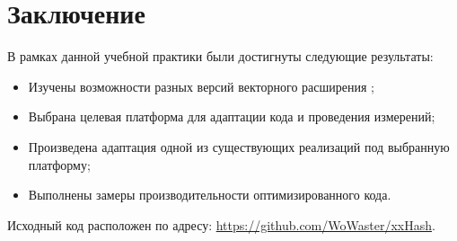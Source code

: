 
\section*{Заключение}
В рамках данной учебной практики были достигнуты следующие результаты:
\begin{itemize}
	\item Изучены возможности разных версий векторного расширения \riscv{};
	\item Выбрана целевая платформа для адаптации кода и проведения измерений;
	\item Произведена адаптация одной из существующих реализаций под выбранную платформу;
	\item Выполнены замеры производительности оптимизированного кода.
\end{itemize}

Исходный код расположен по адресу: \url{https://github.com/WoWaster/xxHash}.
